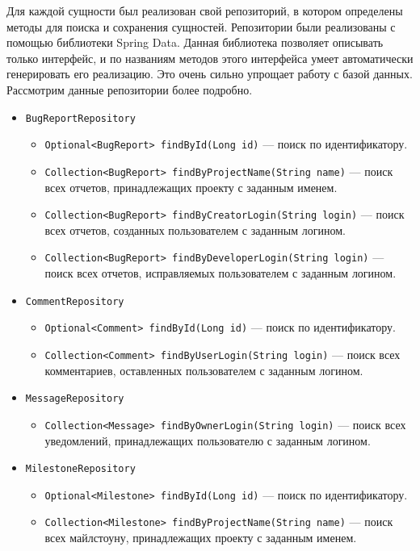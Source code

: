 	Для каждой сущности был реализован свой репозиторий, в котором определены методы для поиска и сохранения сущностей. Репозитории были реализованы с помощью библиотеки Spring Data. Данная библиотека позволяет описывать только интерфейс, и по названиям методов этого интерфейса умеет автоматически генерировать его реализацию. Это очень сильно упрощает работу с базой данных. Рассмотрим данные репозитории более подробно.
	\begin{itemize}
		\item \texttt{BugReportRepository}
		\begin{itemize}
			\item \texttt{Optional<BugReport> findById(Long id)} --- поиск по идентификатору.
			\item \texttt{Collection<BugReport> findByProjectName(String name)} --- поиск всех отчетов, принадлежащих проекту с заданным именем.
			\item \texttt{Collection<BugReport> findByCreatorLogin(String login)} --- поиск всех отчетов, созданных пользователем с заданным логином.
			\item \texttt{Collection<BugReport> findByDeveloperLogin(String login)} --- поиск всех отчетов, исправляемых пользователем с заданным логином.	
		\end{itemize}
		
		\item \texttt{CommentRepository}
		\begin{itemize}
			\item \texttt{Optional<Comment> findById(Long id)} --- поиск по идентификатору.
			\item \texttt{Collection<Comment> findByUserLogin(String login)} --- поиск всех комментариев, оставленных пользователем с заданным логином.
		\end{itemize}
		
		\item \texttt{MessageRepository}
		\begin{itemize}
			\item \texttt{Collection<Message> findByOwnerLogin(String login)} --- поиск всех уведомлений, принадлежащих пользователю с заданным логином.
		\end{itemize}
		
		\item \texttt{MilestoneRepository}
		\begin{itemize}
			\item \texttt{Optional<Milestone> findById(Long id)} --- поиск по идентификатору.
			\item \texttt{Collection<Milestone> findByProjectName(String name)} --- поиск всех майлстоуну, принадлежащих проекту с заданным именем.
		\end{itemize}
		

\end{itemize}
